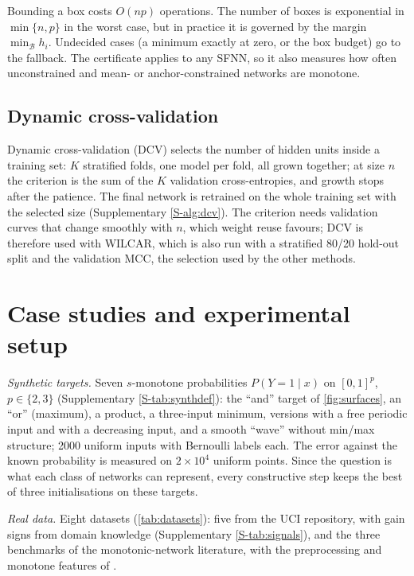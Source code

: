 \documentclass[preprint,12pt,authoryear]{elsarticle}
\newcommand{\B}{\mathcal{B}}
\begin{document}
Bounding a box costs $O(np)$ operations. The number of boxes is exponential in $\min\{n,p\}$ in the worst case, but in
practice it is governed by the margin $\min_\B h_i$. Undecided cases (a minimum exactly at zero, or the box budget) go to
the fallback. The certificate applies to any SFNN, so it also measures how often unconstrained and mean- or
anchor-constrained networks are monotone.

\subsection{Dynamic cross-validation}\label{sec:dcv}
Dynamic cross-validation (DCV) selects the number of hidden units inside a training set: $K$ stratified folds, one model
per fold, all grown together; at size $n$ the criterion is the sum of the $K$ validation cross-entropies, and growth
stops after the patience. The final network is retrained on the whole training set with the selected size
(Supplementary \cref{S-alg:dcv}). The criterion needs validation curves that change smoothly with $n$, which weight
reuse favours; DCV is therefore used with WILCAR, which is also run with a stratified 80/20 hold-out split and the
validation MCC, the selection used by the other methods.

\section{Case studies and experimental setup}\label{sec:setup}

\emph{Synthetic targets.} Seven $s$-monotone probabilities $P(Y=1\mid x)$ on $[0,1]^p$, $p\in\{2,3\}$ (Supplementary
\cref{S-tab:synthdef}): the ``and'' target of \cref{fig:surfaces}, an ``or'' (maximum), a product, a three-input
minimum, versions with a free periodic input and with a decreasing input, and a smooth ``wave'' without min/max
structure; 2000 uniform inputs with Bernoulli labels each. The error against the known probability is measured on
$2\times10^4$ uniform points. Since the question is what each class of networks can represent, every constructive step
keeps the best of three initialisations on these targets.

\emph{Real data.} Eight datasets (\cref{tab:datasets}): five from the UCI repository, with gain signs from domain
knowledge (Supplementary \cref{S-tab:signals}), and the three benchmarks of the monotonic-network literature, with the
preprocessing and monotone features of \citet{Runje2023}.
\end{document}
